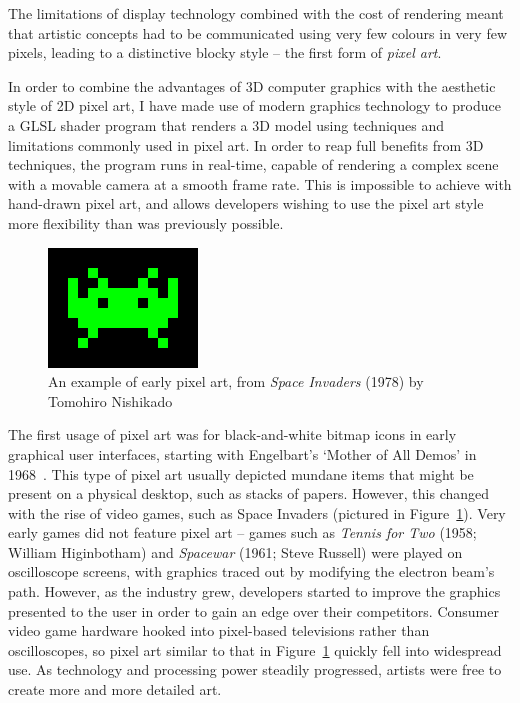 \documentclass[12pt,twoside,notitlepage]{report}
\begin{document}
The limitations of display technology combined with the cost of rendering meant that artistic concepts had to be communicated using very few colours in very few pixels, leading to a distinctive blocky style -- the first form of \textit{pixel art}.

In order to combine the advantages of 3D computer graphics with the aesthetic style of 2D pixel art, I have made use of modern graphics technology to produce a GLSL shader program that renders a 3D model using techniques and limitations commonly used in pixel art. In order to reap full benefits from 3D techniques, the program runs in real-time, capable of rendering a complex scene with a movable camera at a smooth frame rate. This is impossible to achieve with hand-drawn pixel art, and allows developers wishing to use the pixel art style more flexibility than was previously possible.

\begin{figure}[h!]
\centering
\includegraphics{spaceinvadersprite}
\caption{An example of early pixel art, from \textit{Space Invaders} (1978) by Tomohiro Nishikado}
\label{fig:spaceinvader}
\end{figure}

The first usage of pixel art was for black-and-white bitmap icons in early graphical user interfaces, starting with Engelbart's `Mother of All Demos' in 1968~\cite{Engelbart:1968:RCA:1476589.1476645}. This type of pixel art usually depicted mundane items that might be present on a physical desktop, such as stacks of papers. However, this changed with the rise of video games, such as Space Invaders (pictured in Figure~\ref{fig:spaceinvader}). Very early games did not feature pixel art -- games such as \textit{Tennis for Two} (1958; William Higinbotham) and \textit{Spacewar} (1961; Steve Russell) were played on oscilloscope screens, with graphics traced out by modifying the electron beam's path. However, as the industry grew, developers started to improve the graphics presented to the user in order to gain an edge over their competitors. Consumer video game hardware hooked into pixel-based televisions rather than oscilloscopes, so pixel art similar to that in Figure~\ref{fig:spaceinvader} quickly fell into widespread use. As technology and processing power steadily progressed, artists were free to create more and more detailed art.
\end{document}
